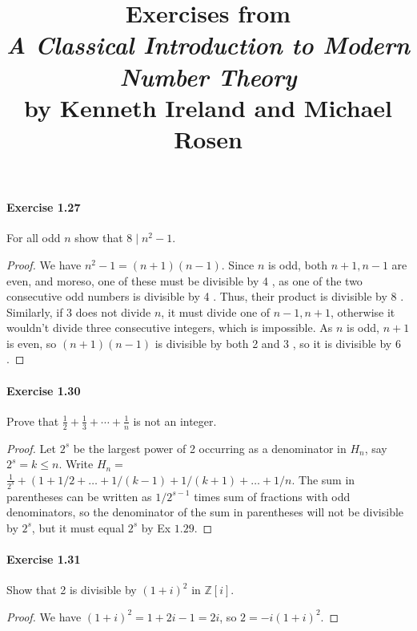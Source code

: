 \documentclass{article}
\title{\textbf{
Exercises from \\
\textit{A Classical Introduction to Modern Number Theory} \\
by Kenneth Ireland and Michael Rosen
}}
\date{}
\begin{document}
\maketitle


\paragraph{Exercise 1.27} For all odd $n$ show that $8 \mid n^{2}-1$.
\begin{proof}
    We have $n^2-1=(n+1)(n-1)$. Since $n$ is odd, both $n+1, n-1$ are even, and moreso, one of these must be divisible by 4 , as one of the two consecutive odd numbers is divisible by 4 . Thus, their product is divisible by 8 . Similarly, if 3 does not divide $n$, it must divide one of $n-1, n+1$, otherwise it wouldn't divide three consecutive integers, which is impossible. As $n$ is odd, $n+1$ is even, so $(n+1)(n-1)$ is divisible by both 2 and 3 , so it is divisible by 6 .
\end{proof}



\paragraph{Exercise 1.30} Prove that $\frac{1}{2}+\frac{1}{3}+\cdots+\frac{1}{n}$ is not an integer.
\begin{proof}
Let $2^s$ be the largest power of 2 occurring as a denominator in $H_n$, say $2^s=k \leqslant n$. Write $H_n=$ $\frac{1}{2^s}+\left(1+1 / 2+\ldots+1 /(k-1)+1 /(k+1)+\ldots+1 / n\right.$. The sum in parentheses can be written as $1 / 2^{s-1}$ times sum of fractions with odd denominators, so the denominator of the sum in parentheses will not be divisible by $2^s$, but it must equal $2^s$ by Ex $1.29$.
\end{proof}



\paragraph{Exercise 1.31} Show that 2 is divisible by $(1+i)^{2}$ in $\mathbb{Z}[i]$.
\begin{proof}
We have $(1+i)^2=1+2 i-1=2 i$, so $2=-i(1+i)^2$.
\end{proof}
\end{document}
